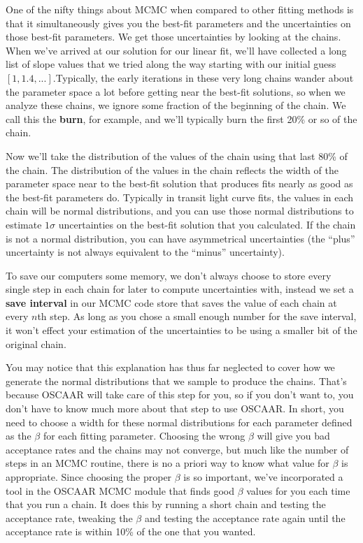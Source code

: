 \documentclass[a4paper]{article}
\begin{document}
One of the nifty things about MCMC when compared to other fitting methods is that it simultaneously gives you the best-fit parameters and the uncertainties on those best-fit parameters. We get those uncertainties by looking at the chains. When we've arrived at our solution for our linear fit, we'll have collected a long list of slope values that we tried along the way starting with our initial guess $[1,1.4, ... ]$.Typically, the early iterations in these very long chains wander about the parameter space a lot before getting near the best-fit solutions, so when we analyze these chains, we ignore some fraction of the beginning of the chain. We call this the \textbf{burn}, for example, and we'll typically burn the first 20\% or so of the chain. 

Now we'll take the distribution of the values of the chain using that last 80\% of the chain. The distribution of the values in the chain reflects the width of the parameter space near to the best-fit solution that produces fits nearly as good as the best-fit parameters do. Typically in transit light curve fits, the values in each chain will be normal distributions, and you can use those normal distributions to estimate $1\sigma$ uncertainties on the best-fit solution that you calculated. If the chain is not a normal distribution, you can have asymmetrical uncertainties (the ``plus'' uncertainty is not always equivalent to the ``minus'' uncertainty). 

To save our computers some memory, we don't always choose to store every single step in each chain for later to compute uncertainties with, instead we set a \textbf{save interval} in our MCMC code store that saves the value of each chain at every $n$th step. As long as you chose a small enough number for the save interval, it won't effect your estimation of the uncertainties to be using a smaller bit of the original chain. 

You may notice that this explanation has thus far neglected to cover how we generate the normal distributions that we sample to produce the chains. That's because OSCAAR will take care of this step for you, so if you don't want to, you don't have to know much more about that step to use OSCAAR. In short, you need to choose a width for these normal distributions for each parameter defined as the $\beta$ for each fitting parameter. Choosing the wrong $\beta$ will give you bad acceptance rates and the chains may not converge, but much like the number of steps in an MCMC routine, there is no a priori way to know what value for $\beta$ is appropriate. Since choosing the proper $\beta$ is so important, we've incorporated a tool in the OSCAAR MCMC module that finds good $\beta$ values for you each time that you run a chain. It does this by running a short chain and testing the acceptance rate, tweaking the $\beta$ and testing the acceptance rate again until the acceptance rate is within 10\% of the one that you wanted. 
\end{document}
